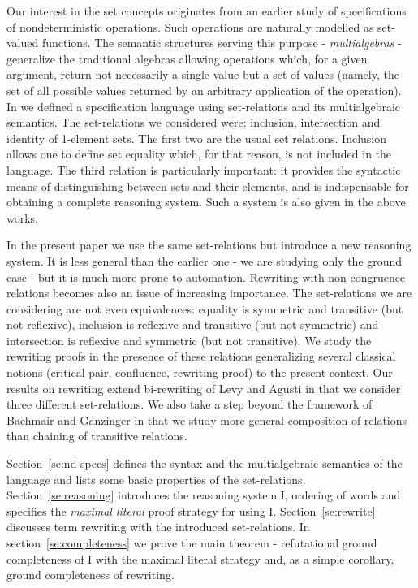 Our interest in the set concepts originates from an earlier study of 
specifications of nondeterministic operations. Such operations are naturally 
modelled as set-valued functions. The semantic structures serving this purpose 
- {\em multialgebras} - generalize the traditional algebras allowing operations 
which, for a given argument, return not necessarily a single value but a set of 
values (namely, the set of all possible values returned by an arbitrary 
application of the operation). In \cite{MW,Mich} we defined a specification 
language using set-relations and its multialgebraic semantics. The 
set-relations we considered were: inclusion, intersection and identity of 
1-element sets. The first two are the usual set relations. Inclusion allows one 
to define set equality which, for that reason, is not included in the language. 
The third relation is particularly important: it provides the syntactic 
\mbox{means}
of distinguishing between sets and their elements, and is indispensable for 
obtaining a complete reasoning system. Such a system is also given in the above 
works.

In the present paper we use the same set-relations but introduce a new 
reasoning system. It is less general than the earlier one - we are studying only 
the ground case - but it is much more prone to automation. Rewriting with 
non-congruence relations becomes also an issue of increasing importance. The 
set-relations we are considering are not even equivalences: equality is 
symmetric and transitive (but not reflexive), inclusion is reflexive and 
transitive (but not symmetric) and intersection is reflexive and symmetric (but 
not transitive). We study the rewriting proofs in the presence of these 
relations generalizing several classical notions (critical pair, confluence, 
rewriting proof) to the present context. Our results on rewriting extend
bi-rewriting of Levy and Agusti \cite{LA} in that we consider three different 
set-relations. We also take a step beyond the framework of Bachmair and 
Ganzinger \cite{BG249} in that we study more general composition of relations 
than chaining of transitive relations.

Section~\ref{se:nd-specs} defines the syntax and the multialgebraic semantics 
of the language and lists some basic properties of the set-relations. 
Section~\ref{se:reasoning} introduces the reasoning system \C I, ordering of 
words and specifies the {\em maximal literal} proof strategy for using \C I.
Section~\ref{se:rewrite} discusses term rewriting with the introduced 
set-relations. In section~\ref{se:completeness} we prove the main theorem - refutational
ground completeness of \C I with the maximal literal strategy and, as a simple 
corollary, ground completeness of rewriting.

